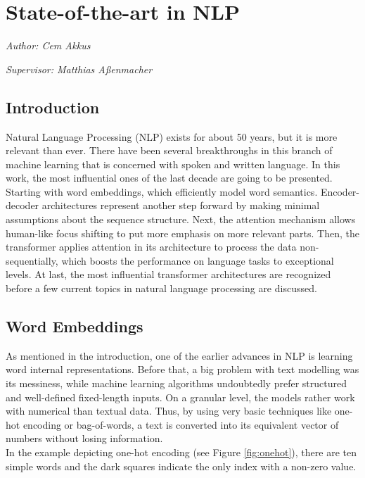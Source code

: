 \documentclass[
]{krantz}
\begin{document}
\hypertarget{c01-01-sota-nlp}{%
\section{State-of-the-art in NLP}\label{c01-01-sota-nlp}}

\emph{Author: Cem Akkus}

\emph{Supervisor: Matthias Aßenmacher}

\hypertarget{introduction-1}{%
\subsection{Introduction}\label{introduction-1}}

Natural Language Processing (NLP) exists for about 50 years, but it is
more relevant than ever. There have been several breakthroughs in this
branch of machine learning that is concerned with spoken and written
language. In this work, the most influential ones of the last decade are
going to be presented. Starting with word embeddings, which efficiently
model word semantics. Encoder-decoder architectures represent another
step forward by making minimal assumptions about the sequence structure.
Next, the attention mechanism allows human-like focus shifting to put
more emphasis on more relevant parts. Then, the transformer applies
attention in its architecture to process the data non-sequentially,
which boosts the performance on language tasks to exceptional levels. At
last, the most influential transformer architectures are recognized
before a few current topics in natural language processing are
discussed.

\hypertarget{word-embeddings}{%
\subsection{Word Embeddings}\label{word-embeddings}}

As mentioned in the introduction, one of the earlier advances in NLP is
learning word internal representations. Before that, a big problem with
text modelling was its messiness, while machine learning algorithms
undoubtedly prefer structured and well-defined fixed-length inputs. On a
granular level, the models rather work with numerical than textual data.
Thus, by using very basic techniques like one-hot encoding or
bag-of-words, a text is converted into its equivalent vector of numbers
without losing information.\\

In the example depicting one-hot encoding (see Figure \ref{fig:onehot}), there
are ten simple words and the dark squares indicate the only index with a
non-zero value.
\end{document}

